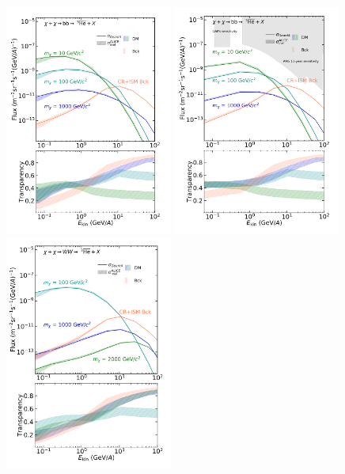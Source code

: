 \begin{figure}
    \centering
    \includegraphics[width=0.49\textwidth]{figures/he3bar_bb_LIS.png}
    \includegraphics[width=0.49\textwidth]{figures/he3bar_bb_SM.png}
    \includegraphics[width=0.49\textwidth]{figures/he3bar_WW_LIS.png}

\end{figure}
